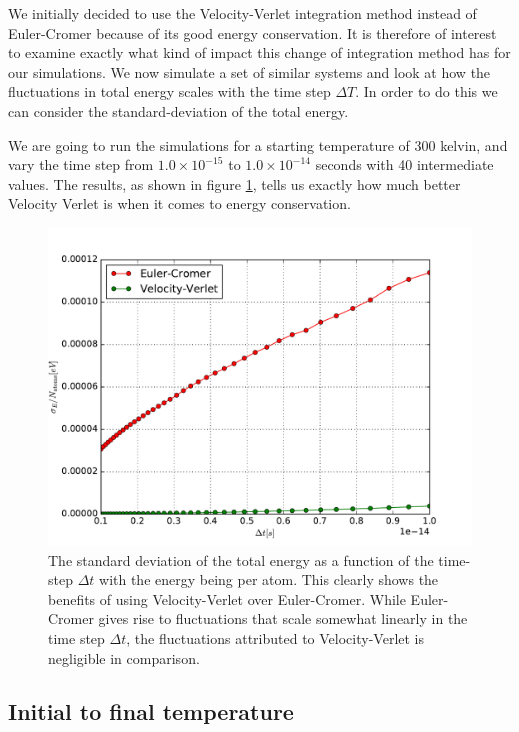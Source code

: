 \documentclass[a4paper]{article}
\begin{document}
    We initially decided to use the Velocity-Verlet integration method instead of
    Euler-Cromer because of its good energy conservation. It is therefore of
    interest to examine exactly what kind of impact this change of integration
    method has for our simulations.  We now simulate a set of similar systems and
    look at how the fluctuations in total energy scales with the time step $\Delta
    T$. In order to do this we can consider the standard-deviation of the total
    energy. 

    We are going to run the simulations for a starting temperature of 300 kelvin,
    and vary the time step from $1.0 \times 10^{-15}$ to $1.0 \times 10^{-14}$
    seconds with 40 intermediate values. The results, as shown in figure
    \ref{fig:energy_fluctuations}, tells us exactly how much better Velocity Verlet
    is when it comes to energy conservation.

    \begin{figure}[h]
        \centering \includegraphics[width=0.8\linewidth]{energy_fluctuations.pdf}
        \caption[Energy fluctuations]{The standard deviation of the total energy as
            a function of the time-step $\Delta t$ with the energy being per atom.
            This clearly shows the benefits of using Velocity-Verlet over
        Euler-Cromer. While Euler-Cromer gives rise to fluctuations that scale
    somewhat linearly in the time step $\Delta t$, the fluctuations attributed to
    Velocity-Verlet is negligible in comparison.}
        \label{fig:energy_fluctuations}
    \end{figure}

\subsection{Initial to final temperature}
\label{sub:initial_to_final_temperature}
\end{document}
